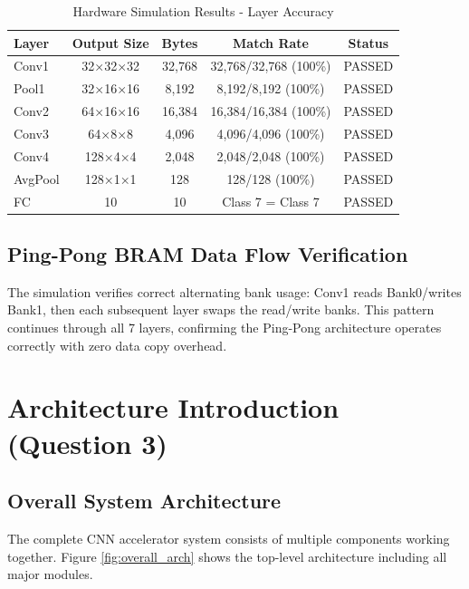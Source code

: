 \documentclass[11pt,a4paper]{article}
\begin{document}
\begin{table}[H]
\centering
\caption{Hardware Simulation Results - Layer Accuracy}
\begin{tabular}{lcccc}
\toprule
\textbf{Layer} & \textbf{Output Size} & \textbf{Bytes} & \textbf{Match Rate} & \textbf{Status} \\
\midrule
Conv1 & 32×32×32 & 32,768 & 32,768/32,768 (100\%) & \textcolor{green!60!black}{PASSED} \\
Pool1 & 32×16×16 & 8,192 & 8,192/8,192 (100\%) & \textcolor{green!60!black}{PASSED} \\
Conv2 & 64×16×16 & 16,384 & 16,384/16,384 (100\%) & \textcolor{green!60!black}{PASSED} \\
Conv3 & 64×8×8 & 4,096 & 4,096/4,096 (100\%) & \textcolor{green!60!black}{PASSED} \\
Conv4 & 128×4×4 & 2,048 & 2,048/2,048 (100\%) & \textcolor{green!60!black}{PASSED} \\
AvgPool & 128×1×1 & 128 & 128/128 (100\%) & \textcolor{green!60!black}{PASSED} \\
FC & 10 & 10 & Class 7 = Class 7 & \textcolor{green!60!black}{PASSED} \\
\bottomrule
\end{tabular}
\end{table}

\subsection{Ping-Pong BRAM Data Flow Verification}
The simulation verifies correct alternating bank usage: Conv1 reads Bank0/writes Bank1, then each subsequent layer swaps the read/write banks. This pattern continues through all 7 layers, confirming the Ping-Pong architecture operates correctly with zero data copy overhead.

\section{Architecture Introduction (Question 3)}

\subsection{Overall System Architecture}

The complete CNN accelerator system consists of multiple components working together. Figure \ref{fig:overall_arch} shows the top-level architecture including all major modules.
\end{document}
